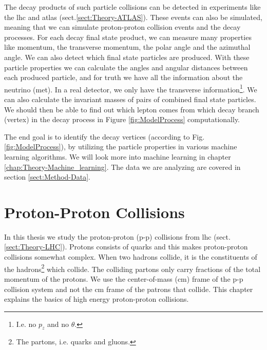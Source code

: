 \documentclass[a4paper, american, 12pt]{report}
\begin{document}
	The decay products of such particle collisions can be detected in experiments like the \acrshort{lhc} and \acrshort{atlas} (sect.\ref{sect:Theory-ATLAS}). These events can also be simulated, meaning that we can simulate proton-proton collision events and the decay processes. For each decay final state product, we can measure many properties like momentum, the transverse momentum, the polar angle and the azimuthal angle. We can also detect which final state particles are produced. With these particle properties we can calculate the angles and angular distances between each produced particle, and for truth we have all the information about the neutrino (\acrshort{met}). In a real detector, we only have the transverse information\footnote{I.e. no $p_z$ and no $\theta$.}. We can also calculate the invariant masses of pairs of combined final state particles. We should then be able to find out which lepton comes from which decay branch (vertex) in the decay process in Figure \ref{fig:ModelProcess} computationally.
	
	The end goal is to identify the decay vertices (according to Fig. \ref{fig:ModelProcess}), by utilizing the particle properties in various machine learning algorithms. We will look more into machine learning in chapter \ref{chap:Theory-Machine_learning}. The data we are analyzing are covered in section \ref{sect:Method-Data}.
	


	\chapter{Proton-Proton Collisions}
	\label{chap:Theory-Proton_collisions}
	In this thesis we study the proton-proton (p-p) collisions from \acrshort{lhc} (sect.\ref{sect:Theory-LHC}). Protons consists of quarks and this makes proton-proton collisions somewhat complex. When two hadrons collide, it is the constituents of the hadrons\footnote{The partons, i.e. quarks and gluons.} which collide. The colliding partons only carry fractions of the total momentum of the protons. We use the center-of-mass (\acrshort{cm}) frame of the p-p collision system and not the \acrshort{cm} frame of the patrons that collide. This chapter explains the basics of high energy proton-proton collisions.

\end{document}
